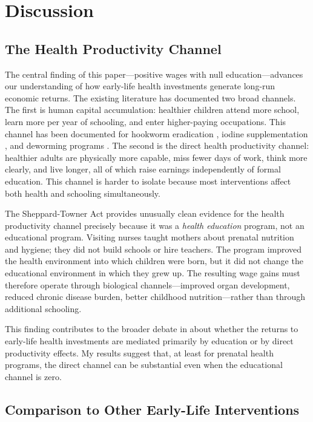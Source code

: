 \documentclass[12pt]{article}
\begin{document}
\section{Discussion}

\subsection{The Health Productivity Channel}

The central finding of this paper---positive wages with null education---advances our understanding of how early-life health investments generate long-run economic returns. The existing literature has documented two broad channels. The first is human capital accumulation: healthier children attend more school, learn more per year of schooling, and enter higher-paying occupations. This channel has been documented for hookworm eradication \citep{bleakley2007}, iodine supplementation \citep{fieldetal2009}, and deworming programs \citep{bairdetal2016}. The second is the direct health productivity channel: healthier adults are physically more capable, miss fewer days of work, think more clearly, and live longer, all of which raise earnings independently of formal education. This channel is harder to isolate because most interventions affect both health and schooling simultaneously.

The Sheppard-Towner Act provides unusually clean evidence for the health productivity channel precisely because it was a \textit{health education} program, not an educational program. Visiting nurses taught mothers about prenatal nutrition and hygiene; they did not build schools or hire teachers. The program improved the health environment into which children were born, but it did not change the educational environment in which they grew up. The resulting wage gains must therefore operate through biological channels---improved organ development, reduced chronic disease burden, better childhood nutrition---rather than through additional schooling.

This finding contributes to the broader debate in \citet{almondetal2018} about whether the returns to early-life health investments are mediated primarily by education or by direct productivity effects. My results suggest that, at least for prenatal health programs, the direct channel can be substantial even when the educational channel is zero.

\subsection{Comparison to Other Early-Life Interventions}
\end{document}
